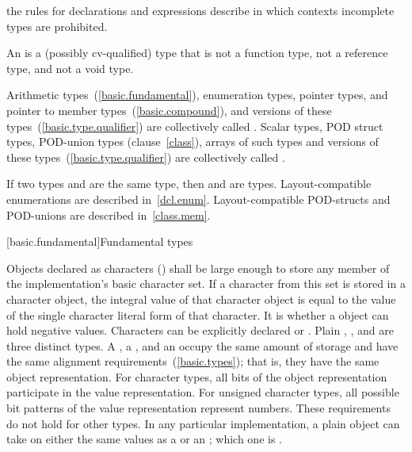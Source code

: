 \pnum
\enternote the rules for declarations and expressions describe in which
contexts incomplete types are prohibited. \exitnote

\pnum
{}%
An  is a (possibly cv-qualified) type that is not
a function type, not a reference type, and not a void type.

\pnum
Arithmetic types~(\ref{basic.fundamental}), enumeration types, pointer
types, and pointer to member types~(\ref{basic.compound}), and
 versions of these
types~(\ref{basic.type.qualifier}) are collectively called
%
. Scalar types, POD struct types, POD-union types
(clause~\ref{class}), arrays of such types and
 versions of these
types~(\ref{basic.type.qualifier}) are collectively called
%
.

\pnum
{}%
If two types  and  are the same type, then
 and  are  types.
\enternote Layout-compatible enumerations are described
in~\ref{dcl.enum}. Layout-compatible POD-structs and POD-unions are
described in~\ref{class.mem}. \exitnote

[basic.fundamental]{Fundamental types}

\pnum
{}%
%
%
%
%
%
%
Objects declared as characters () shall be large enough to
store any member of the implementation's basic character set. If a
character from this set is stored in a character object, the integral
value of that character object is equal to the value of the single
character literal form of that character. It is 
whether a  object can hold negative values.
%
%
%
Characters can be explicitly declared  or
.
%
Plain , , and  are
three distinct types. A , a , and an
 occupy the same amount of storage and have the
same alignment requirements~(\ref{basic.types}); that is, they have the
same object representation. For character types, all bits of the object
representation participate in the value representation. For unsigned
character types, all possible bit patterns of the value representation
represent numbers. These requirements do not hold for other types. In
any particular implementation, a plain  object can take on
either the same values as a  or an ; which one is .

